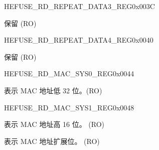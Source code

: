     \begin{register}{H}{EFUSE\_RD\_REPEAT\_DATA3\_REG}{0x003C}\label{regdesc:EFUSERDREPEATDATA3REG}
    \regnewline%
    \begin{regdesc}\begin{reglist}
    \label{fielddesc:EFUSERDREPEATDATA3}\item [EFUSE\_RD\_REPEAT\_DATA3] 保留 (RO)
    \end{reglist}\end{regdesc}
    \end{register}


    \begin{register}{H}{EFUSE\_RD\_REPEAT\_DATA4\_REG}{0x0040}\label{regdesc:EFUSERDREPEATDATA4REG}
    \regnewline%
    \begin{regdesc}\begin{reglist}
    \label{fielddesc:EFUSERDREPEATDATA4}\item [EFUSE\_RD\_REPEAT\_DATA4] 保留 (RO)
    \end{reglist}\end{regdesc}
    \end{register}
    

    \begin{register}{H}{EFUSE\_RD\_MAC\_SYS0\_REG}{0x0044}\label{regdesc:EFUSERDMACSYS0REG}
    \regnewline%
    \begin{regdesc}\begin{reglist}
    \label{fielddesc:EFUSEMAC0}\item [EFUSE\_MAC\_0] 表示 MAC 地址低 32 位。(RO)
    \end{reglist}\end{regdesc}
    \end{register}


    \begin{register}{H}{EFUSE\_RD\_MAC\_SYS1\_REG}{0x0048}\label{regdesc:EFUSERDMACSYS1REG}
    \regnewline%
    \begin{regdesc}\begin{reglist}
    \label{fielddesc:EFUSEMAC1}\item [EFUSE\_MAC\_1] 表示 MAC 地址高 16 位。 (RO)
    \label{fielddesc:EFUSEMACEXT}\item [EFUSE\_MAC\_EXT] 表示 MAC 地址扩展位。 (RO)
    \end{reglist}\end{regdesc}
    \end{register}


